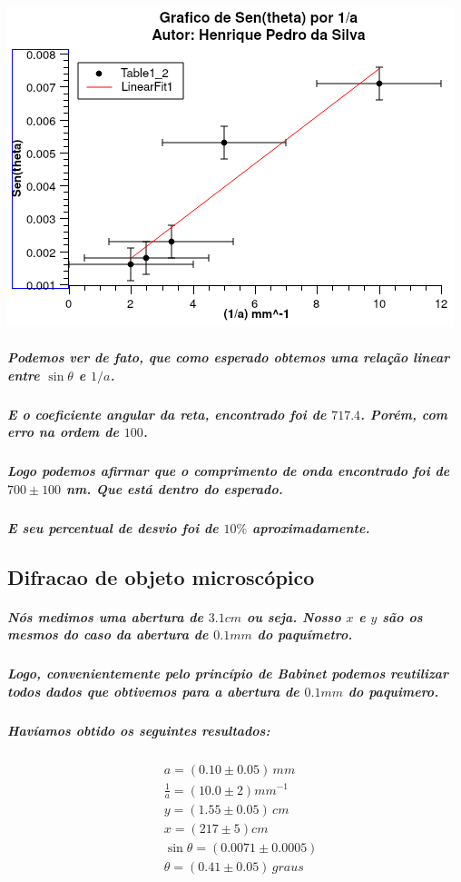\documentclass[12pt,twoside, a4paper, twocolumn]{article}
\begin{document}
\begin{adjustbox}{scale=0.70}
  \includegraphics{Graph1.png}
\end{adjustbox}

\subparagraph*{Podemos ver de fato, que como esperado obtemos uma relação linear entre $\sin{\theta}$ e $1/a$.}

\subparagraph*{E o coeficiente angular da reta, encontrado foi de $717.4$. Porém, com erro na ordem de $100$.}

\subparagraph*{Logo podemos afirmar que o comprimento de onda encontrado foi de $700 \pm 100$ nm. Que está dentro do esperado.}

\subparagraph*{E seu percentual de desvio foi de $10\%$ aproximadamente.}

\pagebreak

\newpage

\subsection{Difracao de objeto microscópico}

\subparagraph*{Nós medimos uma abertura de $3.1cm$ ou seja. Nosso $x$ e $y$ são os mesmos do caso da abertura de $0.1mm$ do paquímetro.}

\subparagraph*{Logo, convenientemente pelo princípio de Babinet podemos reutilizar todos dados que obtivemos para a abertura de $0.1mm$ do paquimero.}

\subparagraph*{Havíamos obtido os seguintes resultados:}

\begin{equation}
  \begin{aligned}
     & a =(0.10 \pm 0.05)\,mm             \\
     & \frac{1}{a} = (10.0 \pm 2)mm^{-1}  \\
     & y = (1.55 \pm 0.05)\,cm            \\
     & x = (217 \pm 5)cm                  \\
     & \sin{\theta} = (0.0071 \pm 0.0005) \\
     & \theta = (0.41 \pm 0.05)\,graus    \\
  \end{aligned}
\end{equation}
\end{document}
